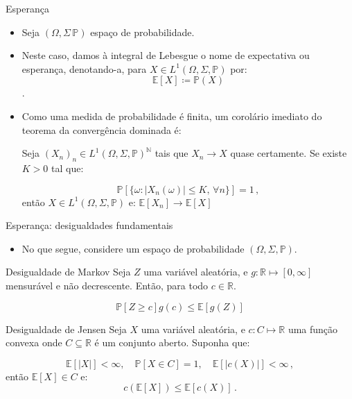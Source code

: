 \documentclass[11pt]{beamer}
\begin{document}
	\begin{frame}{Esperança}
	\begin{itemize}
		\item Seja $(\Omega, \Sigma\,\mathbb{P})$ espaço de probabilidade.
		\item Neste caso, damos à integral de Lebesgue o nome de expectativa ou esperança, denotando-a, para $X \in L^1(\Omega,\Sigma, \mathbb{P})$ por:
		$$\mathbb{E}[X] \coloneqq \mathbb{P}(X)$$.
		\item Como uma medida de probabilidade é finita, um corolário imediato do teorema da convergência dominada é:
		\begin{corollary}
			Seja $(X_n)_n \in L^1(\Omega, \Sigma,\mathbb{P})^{\mathbb{N}}$ tais que $X_n \to X$ quase certamente. Se existe $K>0$ tal que:
			
			$$\mathbb{P}[\{\omega:|X_n(\omega)|\leq K,\,  \forall n\}] = 1\, ,$$
			então $X \in L^1(\Omega, \Sigma,\mathbb{P})$ e:
			$\mathbb{E}[X_n] \to \mathbb{E}[X]$
		\end{corollary}
	\end{itemize}
	\end{frame}
	
	\begin{frame}{Esperança: desigualdades fundamentais}
		\begin{itemize}
			\item No que segue, considere um espaço de probabilidade $(\Omega,\Sigma, \mathbb{P})$.
		\end{itemize}
		\begin{lemma}{Desigualdade de Markov}
			Seja $Z$ uma variável aleatória, e $g: \mathbb{R} \mapsto [0,\infty]$ mensurável e não decrescente.  Então, para todo $c \in \mathbb{R}$.
			
			$$\mathbb{P}[Z\geq c] g(c) \leq \mathbb{E}[g(Z)]$$
		\end{lemma}
		
			\begin{lemma}{Desigualdade de Jensen}
		Seja $X$ uma variável aleatória, e $c: C \mapsto \mathbb{R}$ uma função convexa onde $C \subseteq \mathbb{R}$ é um conjunto aberto. Suponha que:
		
		$$\mathbb{E}[|X|]< \infty, \quad \mathbb{P}[X \in C]  = 1, \quad \mathbb{E}[|c(X)|]<\infty\, ,$$
		então $\mathbb{E}[X] \in C$ e:
		$$c(\mathbb{E}[X])\leq \mathbb{E}[c(X)]\, .$$
		\end{lemma}
	\end{frame}
	
\end{document}
